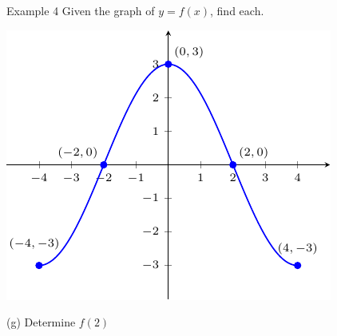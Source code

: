 \documentclass[t,usenames,dvipsnames]{beamer}
\begin{document}
\begin{frame}{Example 4}
Given the graph of $y=f(x)$, find each. \newline\\
\begin{minipage}{0.6\textwidth}
\includegraphics{example4.pdf}
\end{minipage}
\hspace{0.5cm}
\begin{minipage}{0.33\textwidth}
(g) Determine $f(2)$  \\\\
 \\\\
 \\\\
\end{minipage}
\end{frame}
\end{document}

